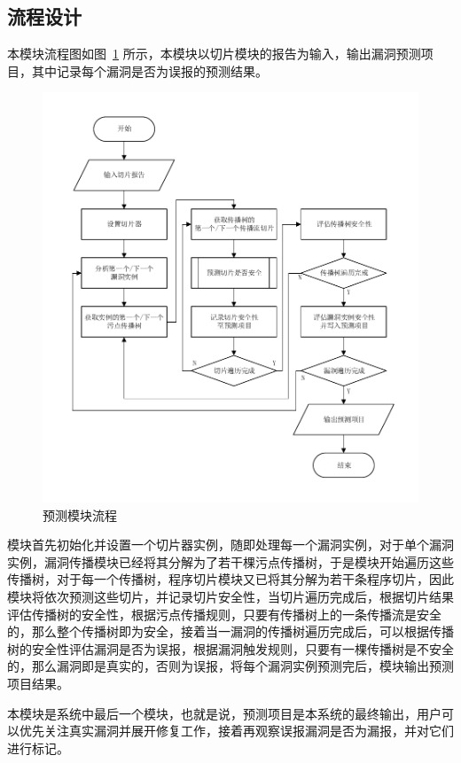 \subsection{流程设计}

本模块流程图如图~\ref{predictProcessing} 所示，本模块以切片模块的报告为输入，输出漏洞预测项目，其中记录每个漏洞是否为误报的预测结果。

\begin{figure}[!htbp]
    \centering
    \includegraphics[width=0.9\linewidth]{FIGs/chapter3/predictProcessing.pdf}
    \caption{预测模块流程}\label{predictProcessing}
\end{figure}

模块首先初始化并设置一个切片器实例，随即处理每一个漏洞实例，对于单个漏洞实例，漏洞传播模块已经将其分解为了若干棵污点传播树，于是模块开始遍历这些传播树，对于每一个传播树，程序切片模块又已将其分解为若干条程序切片，因此模块将依次预测这些切片，并记录切片安全性，当切片遍历完成后，根据切片结果评估传播树的安全性，根据污点传播规则，只要有传播树上的一条传播流是安全的，那么整个传播树即为安全，接着当一漏洞的传播树遍历完成后，可以根据传播树的安全性评估漏洞是否为误报，根据漏洞触发规则，只要有一棵传播树是不安全的，那么漏洞即是真实的，否则为误报，将每个漏洞实例预测完后，模块输出预测项目结果。

本模块是系统中最后一个模块，也就是说，预测项目是本系统的最终输出，用户可以优先关注真实漏洞并展开修复工作，接着再观察误报漏洞是否为漏报，并对它们进行标记。

